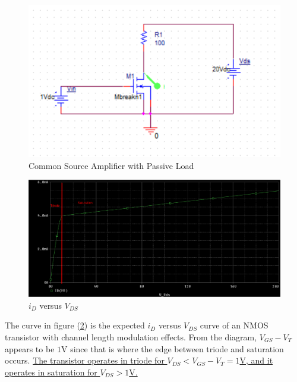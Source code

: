 \FloatBarrier

\begin{figure}[h!]
	\centering
	\includegraphics[scale=1]{./images/circuit1.PNG}
	\caption{Common Source Amplifier with Passive Load}
	\label{fig:circuit1}
\end{figure}

\FloatBarrier

\FloatBarrier

\begin{figure}[h!]
	\centering
	\includegraphics[scale=0.25]{./images/id_vs_vds.PNG}
	\caption{$i_D$ versus $V_{DS}$}
	\label{fig:id_vs_vds}
\end{figure}

\FloatBarrier

The curve in figure (\ref{fig:id_vs_vds}) is the expected $i_D$ versus $V_{DS}$ curve of an NMOS transistor with channel length modulation effects. From the diagram, $V_{GS} - V_T$ appears to be $1$\si{\volt} since that is where the edge between triode and saturation occurs. \uline{The transistor operates in triode for $V_{DS} < V_{GS} - V_T = 1$\si{\volt}, and it operates in saturation for $V_{DS} > 1$\si{\volt}.}

